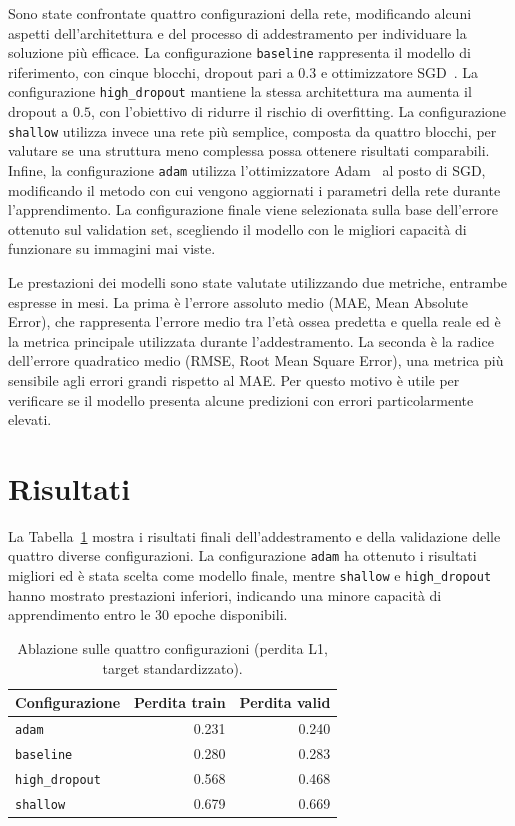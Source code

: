 \documentclass{article}
\begin{document}
Sono state confrontate quattro configurazioni della rete, modificando alcuni aspetti dell'architettura e del processo di addestramento per individuare la soluzione più efficace. La configurazione \texttt{baseline} rappresenta il modello di riferimento, con cinque blocchi, dropout pari a $0.3$ e ottimizzatore SGD~\cite{goodfellow2016}. La configurazione \texttt{high\_dropout} mantiene la stessa architettura ma aumenta il dropout a $0.5$, con l'obiettivo di ridurre il rischio di overfitting. La configurazione \texttt{shallow} utilizza invece una rete più semplice, composta da quattro blocchi, per valutare se una struttura meno complessa possa ottenere risultati comparabili. Infine, la configurazione \texttt{adam} utilizza l'ottimizzatore Adam~\cite{kingma2015adam} al posto di SGD, modificando il metodo con cui vengono aggiornati i parametri della rete durante l'apprendimento. 
La configurazione finale viene selezionata sulla base dell'errore ottenuto sul validation set, scegliendo il modello con le migliori capacità di funzionare su immagini mai viste.

Le prestazioni dei modelli sono state valutate utilizzando due metriche, entrambe espresse in mesi. La prima è l'errore assoluto medio (MAE, Mean Absolute Error), che rappresenta l'errore medio tra l'età ossea predetta e quella reale ed è la metrica principale utilizzata durante l'addestramento. La seconda è la radice dell'errore quadratico medio (RMSE, Root Mean Square Error), una metrica più sensibile agli errori grandi rispetto al MAE. Per questo motivo è utile per verificare se il modello presenta alcune predizioni con errori particolarmente elevati.

\section{Risultati}
La Tabella~\ref{tab:ablation} mostra i risultati finali dell'addestramento e della validazione delle quattro diverse configurazioni. La configurazione \texttt{adam} ha ottenuto i risultati migliori ed è stata scelta come modello finale, mentre \texttt{shallow} e \texttt{high\_dropout} hanno mostrato prestazioni inferiori, indicando una minore capacità di apprendimento entro le 30 epoche disponibili.

\begin{table}[htbp]
\centering
\begin{tabular}{lrr}
\toprule
Configurazione & Perdita train & Perdita valid \\
\midrule
\texttt{adam}         & 0.231 & 0.240 \\
\texttt{baseline}     & 0.280 & 0.283 \\
\texttt{high\_dropout} & 0.568 & 0.468 \\
\texttt{shallow}      & 0.679 & 0.669 \\
\bottomrule
\end{tabular}
\caption{Ablazione sulle quattro configurazioni (perdita L1, target standardizzato).}
\label{tab:ablation}
\end{table}
\end{document}
